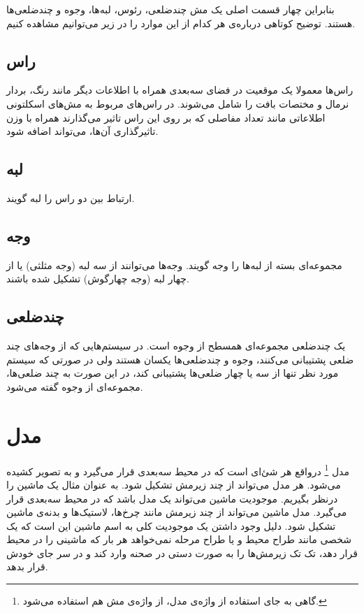 بنابراین چهار قسمت اصلی یک مش چندضلعی، رئوس، لبه‌ها، وجوه و چندضلعی‌ها هستند. توضیح کوتاهی درباره‌ی هر کدام از این موارد را در زیر می‌توانیم مشاهده کنیم.

\subsection{راس}
راس‌ها معمولا یک موقعیت در فضای سه‌بعدی همراه با اطلاعات دیگر مانند رنگ، بردار نرمال و مختصات بافت را شامل می‌شوند. 
در راس‌های مربوط به مش‌های اسکلتونی اطلاعاتی مانند تعداد مفاصلی که بر روی این راس تاثیر می‌گذارند همراه با وزن تاثیرگذاری آن‌ها، می‌تواند اضافه شود.

\subsection{لبه}
ارتباط بین دو راس را لبه گویند.

\subsection{وجه}
مجموعه‌ای بسته از لبه‌ها را وجه گویند. وجه‌ها می‌توانند از سه لبه 
(وجه مثلثی)
یا از چهار لبه
(وجه چهارگوش)
تشکیل شده باشند.

\subsection{چندضلعی}
یک چندضلعی مجموعه‌ای همسطح از وجوه است.
در سیستم‌هایی که از وجه‌های چند ضلعی پشتیبانی می‌کنند، وجوه و چندضلعی‌ها یکسان هستند ولی در صورتی که سیستم مورد نظر تنها از سه یا چهار ضلعی‌ها پشتیبانی کند، در این صورت به چند ضلعی‌ها، مجموعه‌ای از وجوه گفته می‌شود.

\section{مدل}

مدل‌
\footnote{ گاهی به جای استفاده از واژه‌ی مدل، از واژه‌ی مش هم استفاده می‌شود.}
درواقع هر شئ‌ای است که در محیط سه‌بعدی قرار می‌گیرد و به تصویر کشیده ‌می‌شود. هر مدل می‌تواند از چند زیرمش تشکیل شود.
به عنوان مثال یک ماشین را درنظر بگیریم. موجودیت ماشین می‌تواند یک مدل باشد که در محیط سه‌بعدی قرار می‌گیرد. مدل ماشین می‌تواند از چند زیرمش مانند چرخ‌ها، لاستیک‌ها و بدنه‌ی ماشین تشکیل شود. دلیل وجود داشتن یک موجودیت کلی به اسم ماشین این است که یک ‌شخصی مانند طراح محیط و یا طراح مرحله ‌نمی‌خواهد هر بار که ماشینی را در محیط قرار دهد، تک تک زیرمش‌ها را به صورت دستی در صحنه وارد کند و در سر جای خودش قرار بدهد.


